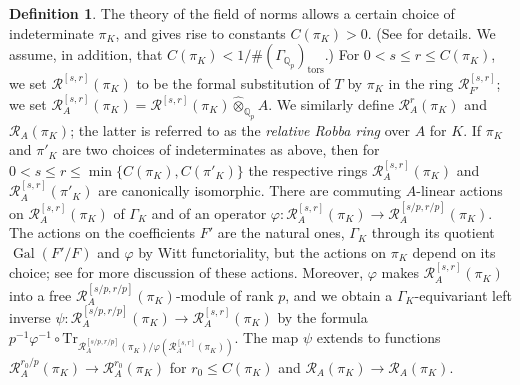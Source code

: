 \documentclass[12pt]{article}
\theoremstyle{definition}
\newtheorem{defn}[theorem]{Definition}
\numberwithin{equation}{theorem}
\newcommand{\calR}{\mathcal{R}}
\newcommand{\QQ}{\mathbb{Q}}
\def\Qp{\QQ_p}
\newcommand{\tors}{\mathrm{tors}}
\newcommand{\Tr}{\mathrm{Tr}}
\DeclareMathOperator{\Gal}{Gal}
\begin{document}
\begin{defn}\label{D:field of norms}
The theory of the field of norms allows a certain choice of
indeterminate $\pi_K$, and gives rise to constants $C(\pi_K)>0$.  (See
\cite[pp.~154--156]{fontaine-ouyang} for details.  We assume, in
addition, that $C(\pi_K) < 1/\#(\Gamma_{\Qp})_\tors$.)
For $0 < s \leq r\leq C(\pi_K)$, we set $\calR^{[s,r]}(\pi_K)$ to be the formal substitution of $T$ by $\pi_K$ in the ring $\calR_{F'}^{[s,r]}$; we set $\calR_A^{[s,r]}(\pi_K)  = \calR^{[s,r]}(\pi_K) \widehat \otimes_{\Qp} A$.  We similarly define $\calR_A^r(\pi_K)$ and $\calR_A(\pi_K)$; the latter is referred to as the \emph{relative Robba ring} over $A$ for $K$.
If $\pi_K$ and $\pi'_K$ are two choices of indeterminates as above, then for $0<s \leq r \leq \min\{C(\pi_K),C(\pi'_K)\}$ the respective rings $\calR_A^{[s,r]}(\pi_K)$ and $\calR_A^{[s,r]}(\pi'_K)$ are canonically isomorphic.
There are commuting $A$-linear actions on $\calR_A^{[s,r]}(\pi_K)$ of $\Gamma_K$ and of an operator $\varphi:\calR_A^{[s,r]}(\pi_K) \to \calR_A^{[s/p,r/p]}(\pi_K)$.  
The actions on the coefficients $F'$ are the natural ones, $\Gamma_K$ through its
quotient $\Gal(F'/F)$ and $\varphi$ by Witt functoriality, but the actions on $\pi_K$ depend on its choice; see \cite{berger-intro} for more discussion of these actions.  Moreover, $\varphi$ makes $\calR_A^{[s,r]}(\pi_K)$ into a free $\calR_A^{[s/p,r/p]}(\pi_K)$-module of rank $p$, and we obtain a $\Gamma_K$-equivariant left inverse $\psi : \calR_A^{[s/p,r/p]}(\pi_K) \to \calR_A^{[s,r]}(\pi_K)$ by the formula $p^{-1}\varphi^{-1} \circ
\Tr_{\calR_A^{[s/p,r/p]}(\pi_K)/\varphi( \calR_A^{[s,r]}(\pi_K))}$.  The map $\psi$ extends to functions $\calR_A^{r_0/p}(\pi_K) \to \calR_A^{r_0}(\pi_K)$ for $r_0 \leq C(\pi_K)$ and $\calR_A(\pi_K) \to \calR_A(\pi_K)$.
\end{defn}
\end{document}
